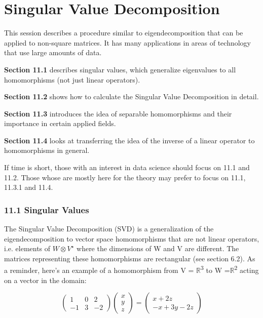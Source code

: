 \documentclass[oneside,english]{amsbook}
\numberwithin{section}{chapter}
\theoremstyle{plain}
\theoremstyle{definition}
\begin{document}
\chapter{Singular Value Decomposition}

This session describes a procedure similar to eigendecomposition that
can be applied to non-square matrices. It has many applications in areas
of technology that use large amounts of data.

\textbf{Section 11.1} describes singular values, which generalize
eigenvalues to all homomorphisms (not just linear operators).

\textbf{Section 11.2} shows how to calculate the Singular Value
Decomposition in detail.

\textbf{Section 11.3} introduces the idea of separable homomorphisms and
their importance in certain applied fields.

\textbf{Section 11.4} looks at transferring the idea of the inverse of a
linear operator to homomorphisms in general.

If time is short, those with an interest in data science should focus on
11.1 and 11.2. Those whose are mostly here for the theory may prefer to
focus on 11.1, 11.3.1 and 11.4.

\subsection{11.1 Singular Values}\label{singular-values}

The Singular Value Decomposition (SVD) is a generalization of the
eigendecomposition to vector space homomorphisms that are not linear
operators, i.e. elements of $W\otimes V^\star$ where the dimensions of W and V are
different. The matrices representing these homomorphisms are rectangular
(see section 6.2). As a reminder, here's an example of a homomorphism
from V = $\mathbb{R}$\textsuperscript{3} to W
=$\mathbb{R}$\textsuperscript{2} acting on a vector in the domain:

\[\begin{pmatrix}
	1 & 0 & 2 \\
	- 1 & 3 & - 2
\end{pmatrix}\begin{pmatrix}
	x \\
	y \\
	z
\end{pmatrix} = \begin{pmatrix}
	x + 2z \\
	- x + 3y - 2z
\end{pmatrix}\]
\end{document}
